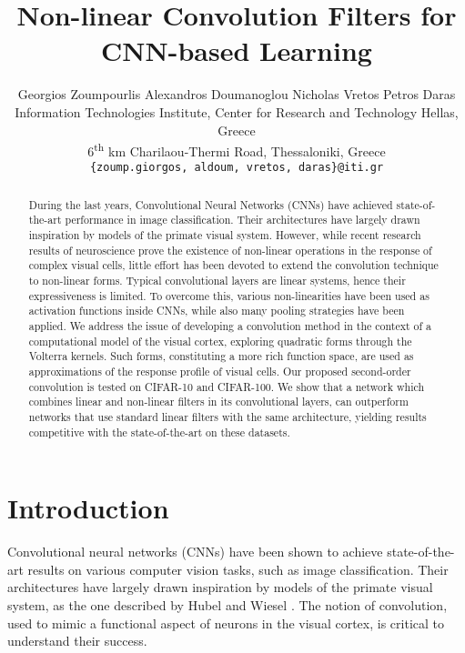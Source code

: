\documentclass[10pt,twocolumn,letterpaper]{article}
\begin{document}
\title{Non-linear Convolution Filters for CNN-based Learning}

\author{Georgios Zoumpourlis \quad Alexandros Doumanoglou \quad Nicholas Vretos \quad Petros Daras\\
Information Technologies Institute, Center for Research and Technology Hellas, Greece\\
6\textsuperscript{th} km Charilaou-Thermi Road, Thessaloniki, Greece\\
{\tt\small \{{zoump.giorgos, aldoum, vretos, daras}\}@iti.gr}
}

\maketitle
\thispagestyle{empty}


\begin{abstract}
   During the last years, Convolutional Neural Networks (CNNs) have achieved state-of-the-art performance in image classification. Their architectures have largely drawn inspiration by models of the primate visual system. However, while recent research results of neuroscience prove the existence of non-linear operations in the response of complex visual cells, little effort has been devoted to extend the convolution technique to non-linear forms. Typical convolutional layers are linear systems, hence their expressiveness is limited. To overcome this, various non-linearities have been used as activation functions inside CNNs, while also many pooling strategies have been applied. We address the issue of developing a convolution method in the context of a computational model of the visual cortex, exploring quadratic forms through the Volterra kernels. Such forms, constituting a more rich function space, are used as approximations of the response profile of visual cells. Our proposed second-order convolution is tested on CIFAR-10 and CIFAR-100. We show that a network which combines linear and non-linear filters in its convolutional layers, can outperform networks that use standard linear filters with the same architecture, yielding results competitive with the state-of-the-art on these datasets.
\end{abstract}

\section{Introduction}

     Convolutional neural networks (CNNs) have been shown to achieve state-of-the-art results on various computer vision tasks, such as image classification. Their architectures have largely drawn inspiration by models of the primate visual system, as the one described by Hubel and Wiesel \cite{Hubel62}. The notion of convolution, used to mimic a functional aspect of neurons in the visual cortex, is critical to understand their success.
     
\end{document}
